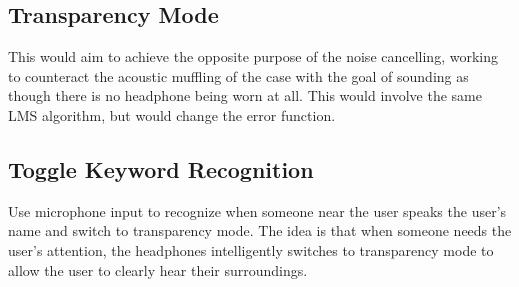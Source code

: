 \documentclass{fpgairpods}
\begin{document}
\begin{multicols*}{2}
\subsection{Transparency Mode}
This would aim to achieve the opposite purpose of the noise cancelling, working to counteract the acoustic muffling of the case with the goal of sounding as though there is no headphone being worn at all. This would involve the same LMS algorithm, but would change the error function.

\subsection{Toggle Keyword Recognition}
Use microphone input to recognize when someone near the user speaks the user's name and switch to transparency mode. The idea is that when someone needs the user's attention, the headphones intelligently switches to transparency mode to allow the user to clearly hear their surroundings.

\printbibliography
\end{multicols*}
\end{document}
